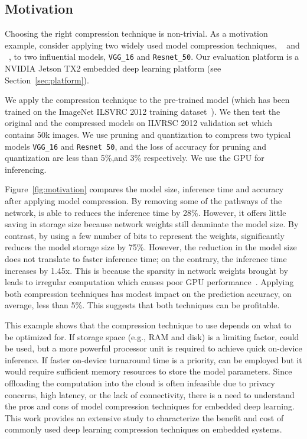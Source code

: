 \subsection{Motivation}
Choosing the right compression technique is non-trivial. As a motivation example, consider applying two widely used model compression
techniques, \pruning~\cite{manessi2017automated} and \dquantization~\cite{han2015deep}, to two influential \CNN models, \texttt{VGG\_16} 	and
\texttt{Resnet\_50}. Our evaluation platform is a NVIDIA Jetson TX2 embedded deep learning platform (see Section~\ref{sec:platform}).

 We apply the compression technique to the pre-trained model (which has been trained on the ImageNet ILSVRC 2012
training dataset~\cite{imagenet2012}). We then test the original and the compressed models on ILVRSC 2012 validation set which contains 50k images.
We use pruning and quantization to compress two typical models \texttt{VGG\_16} and \texttt{Resnet 50},
and the loss of accuracy for pruning and quantization are less than 5\%,and 3\% respectively.
We use the GPU for
inferencing.

 Figure~\ref{fig:motivation} compares the model size, inference time and accuracy after applying model
compression. By removing some of the pathways of the network, \pruning is able to reduces the inference time by 28\%. However, it offers
little saving in storage size because network weights still deaminate the model size. By contrast, by using a few number of bits to
represent the weights, \quantization significantly reduces the model storage size by 75\%. However, the reduction in the model size does
not translate to faster inference time; on the contrary, the inference time increases by 1.45x. This is because the sparsity in network
weights brought by \quantization leads to irregular computation which causes poor GPU performance~\cite{}. Applying both compression
techniques has modest impact on the prediction accuracy, on average, less than 5\%. This suggests that both techniques can be profitable.

 This example shows that the compression technique to use depends on what to be optimized for. If storage
space (e.g., RAM and disk) is a limiting factor, \quantization could be used, but a more powerful processor unit is required to achieve
quick on-device inference. If faster on-device turnaround time is a priority, \pruning can be employed but it would require sufficient
memory resources to store the model parameters.  Since offloading the computation into the cloud is often infeasible due to privacy
concerns, high latency, or the lack of connectivity, there is a need to understand the pros and cons of model compression techniques for
embedded deep learning. This work provides an extensive study to characterize the benefit and cost of commonly used deep learning
compression techniques on embedded systems.
